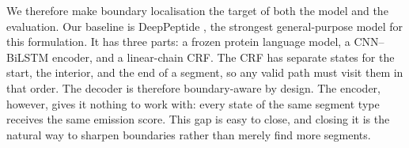 \documentclass{article}
\begin{document}
We therefore make boundary localisation the target of both the model and the evaluation. Our baseline is DeepPeptide \citep{teufel2023deeppeptide}, the strongest general-purpose model for this formulation. It has three parts: a frozen protein language model, a CNN--BiLSTM encoder, and a linear-chain CRF. The CRF has separate states for the start, the interior, and the end of a segment, so any valid path must visit them in that order. The decoder is therefore boundary-aware by design. The encoder, however, gives it nothing to work with: every state of the same segment type receives the same emission score. This gap is easy to close, and closing it is the natural way to sharpen boundaries rather than merely find more segments. 



\end{document}
